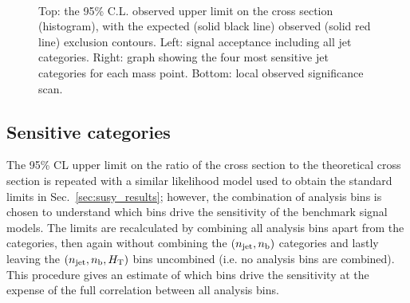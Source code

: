 \begin{figure}[h!]
\begin{center}
{            \label{fig:T1qqqqLL_signif}
        } ~~
        \caption{Top: the 95\% C.L. observed upper limit on the cross section
            (histogram), with the expected (solid black line) observed
            (solid red line) exclusion contours. Left: signal acceptance
            including all jet categories. Right: graph showing the four
            most sensitive jet categories for each mass point. Bottom:
            local observed significance scan.
        }
        \label{fig:T1qqqqLL:ctau-1}
    \end{center}
\end{figure}

\subsection{Sensitive categories}

The 95\% CL upper limit on the ratio of the cross section to the theoretical
cross section is repeated with a similar likelihood model used to obtain the
standard limits in Sec.~\ref{sec:susy_results}; however, the combination of
analysis bins is chosen to understand which bins drive the sensitivity of the
benchmark signal models. The limits are recalculated by combining all analysis
bins apart from the \nj categories, then again without combining the
$(n_{\text{jet}}, n_{\text{b}})$ categories and lastly leaving the $(n_{\text{jet}}, n_{\text{b}}, \mbox{$H_\text{T}$})$ bins
uncombined (i.e. no analysis bins are combined). This procedure gives an
estimate of which bins drive the sensitivity at the expense of the full
correlation between all analysis bins.

